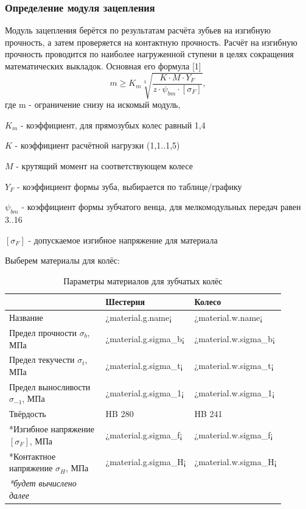 \documentclass[14pt,a4paper,russian]{scrartcl}
\begin{document}
    \subsubsection{Определение модуля зацепления}
        Модуль зацепления берётся по результатам расчёта зубьев на изгибную прочность, а затем проверяется
        на контактную прочность. Расчёт на изгибную прочность проводится по наиболее нагруженной ступени в целях
        сокращения математических выкладок. Основная его формула [1]
        \[ m \geq K_m\sqrt[3]{\frac{K\cdot M\cdot Y_F}{z\cdot\psi_{bm}\cdot[\sigma_F]}}, \]
        где m - ограничение снизу на искомый модуль,\par
            \( K_m \) - коэффициент, для прямозубых колес равный 1,4\par 
            \( K \) - коэффициент расчётной нагрузки (1,1..1,5)\par
            \( M \) - крутящий момент на соответствующем колесе\par
            \( Y_F \) - коэффициент формы зуба, выбирается по таблице/графику\par
            \( \psi_{bm} \) - коэффициент формы зубчатого венца, для мелкомодульных передач равен 3..16\par
            \( [\sigma_F] \) - допускаемое изгибное напряжение для материала\par
        
        Выберем материалы для колёс:
        \begin{table}[h!]
            \begin{center}
                \begin{tabular}{p{0.5\linewidth}p{0.2\linewidth}p{0.2\linewidth}}
                    \hline
                        & Шестерня  &   Колесо\\
                    \hline
                    Название    & ¿material.g.name¡ &   ¿material.w.name¡ \\
                    Предел прочности \( \sigma_b \), МПа  & ¿material.g.sigma_b¡ & ¿material.w.sigma_b¡ \\
                    Предел текучести \( \sigma_t \), МПа  &   ¿material.g.sigma_t¡ & ¿material.w.sigma_t¡ \\
                    Предел выносливости \( \sigma_{-1} \), МПа  & ¿material.g.sigma_1¡ & ¿material.w.sigma_1¡ \\
                    Твёрдость       & HB 280 & HB 241 \\
                    *Изгибное напряжение \( [\sigma_F] \), МПа & ¿material.g.sigma_f¡ & ¿material.w.sigma_f¡ \\
                    *Контактное напряжение \( \sigma_H \), МПа & ¿material.g.sigma_H¡ & ¿material.w.sigma_H¡ \\
                    \hline
                    \emph{*будет вычислено далее}
                \end{tabular}
                \caption{Параметры материалов для зубчатых колёс}\label{tab:gear_materials}
            \end{center}
        \end{table}
\end{document}
